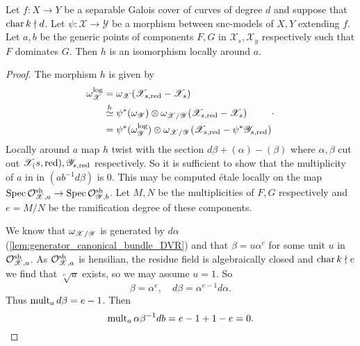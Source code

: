 \begin{proposition}\label{prop:pullback_log_canonincal}
	Let $f: X \to Y$ be a separable Galois cover of curves of degree $d$ and suppose that  $\operatorname{char} k \nmid d$. 
	Let $\psi: \mathscr X \to \mathscr Y$ be a morphism between snc-models of $X, Y$ extending  $f$.
	Let $a, b$ be the generic points of components $F, G$ in $\mathscr X_s, \mathscr X_y$ respectively such that $F$ dominates $G$. 
	Then $h$ is an isomorphism locally around $a$. 
\end{proposition}
\begin{proof}
	The morphism $h$ is given by 
	\[
	\begin{aligned}
		\omega_{\mathscr X}^{\text{log}} &= \omega_{\mathscr{X}}(\mathscr{X}_{s, \text{red}} - \mathscr{X}_s) \\
						 &\overset h\simeq \psi^*(\omega_{\mathscr{Y}}) \otimes \omega_{\mathscr{X} / \mathscr{Y}} (\mathscr{X}_{s, \text{red}} - \mathscr{X}_s) \\
						 &= \psi^*(\omega_{\mathscr{Y}}^{\text{log}}) \otimes \omega_{\mathscr X / \mathscr{Y}}(\mathscr{X} _{s, \text{red}} - \psi^*\mathscr{Y}_{s, \text{red}}) \\
	\end{aligned}
	.\] 
	Locally around $a$ map $h$ twist with the section $d\beta + (\alpha) - (\beta)$ where $\alpha, \beta$ cut out $\mathscr{X}_(s, \text{red}), \mathscr{Y}_{s, \text{red}} $ respectively. 
	So it is sufficient to show that the multiplicity of $a$ in in $(a b^{-1}d\beta)$ is $0$.  
	This may be computed étale locally on the map $\operatorname{Spec} \mathcal{O}_{\mathscr{X}, a}^{\text{sh}} \to \operatorname{Spec} \mathcal{O}^{\text{sh}}_{\mathscr{Y}, b}$. 
	Let $M, N$ be the multiplicities of $F, G$ respectively and $e = M / N$ be the ramification degree of these components. 

	We know that $\omega_{\mathscr{X} / \mathscr{Y}}$ is generated by $d \alpha$ (\cref{lem:generator_canonical_bundle_DVR}) and that $\beta = u \alpha ^{e} $ for some unit $u$ in $\mathcal{O}_{\mathscr{X}, a}^{\text{sh}}$. 
	As $\mathcal{O}_{\mathscr{X}, a}^{\text{sh}}$ is hensilian, the residue field is algebraically closed and $\operatorname{char} k \nmid e$ we find that $\sqrt[e]{u} $ exists, so we may assume $u =  1$. 
	So \[
	\beta = \alpha^{e},\quad d\beta = \alpha^{e-1}d\alpha
	.\]  
	Thus $\operatorname{mult}_{a} d\beta = e - 1$. 
	Then \[
		\operatorname{mult}_a \alpha \beta^{-1} db = e - 1 + 1 - e = 0
	.\]
\end{proof}


